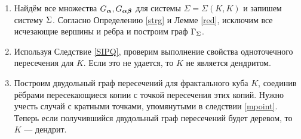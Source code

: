  \begin{enumerate}

    \item Найдём все множества $G_{\bm{\alpha}}, G_{{\bm{\alpha}}{\bm{\beta}}}$ для системы $\Sigma=\Sigma(K,K)$ и запишем систему $\Sigma$.
    Согласно Определению \ref{strg} и Лемме \ref{red}, исключим все исчезающие вершины и ребра и построим граф $\Gamma_\Sigma$.
   
    \item Используя Следствие \ref{SIPQ}, проверим выполнение свойства одноточечного пересечения для $K$.
    Если это не удается, то $K$ не является дендритом.
    
    \item Построим двудольный граф пересечений для фрактального куба $K$, соединив рёбрами пересекающиеся копии с точкой пересечения этих копий. 
    Нужно учесть случай с кратными точками, упомянутыми в следствии \ref{mpoint}.
    Теперь если получившийся двудольный граф пересечений будет деревом, то $K$ --- дендрит.
    
\end{enumerate}